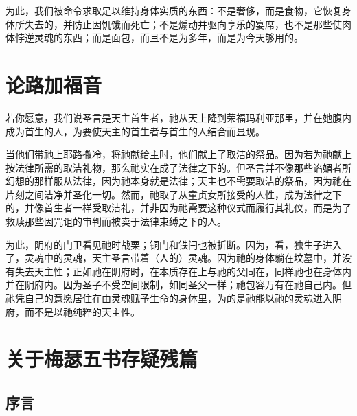 \par

为此，我们被命令求取足以维持身体实质的东西：不是奢侈，而是食物，它恢复身体所失去的，并防止因饥饿而死亡；不是煽动并驱向享乐的宴席，也不是那些使肉体悖逆灵魂的东西；而是面包，而且不是为多年，而是为今天够用的。\par


\section{论路加福音}

 若你愿意，我们说圣言是天主首生者，祂从天上降到荣福玛利亚那里，并在她腹内成为首生的人，为要使天主的首生者与首生的人结合而显现。\par

 当他们带祂上耶路撒冷，将祂献给主时，他们献上了取洁的祭品。因为若为祂献上按法律所需的取洁礼物，那么祂实在成了法律之下的。但圣言并不像那些谄媚者所幻想的那样服从法律，因为祂本身就是法律；天主也不需要取洁的祭品，因为祂在片刻之间洁净并圣化一切。然而，祂取了从童贞女所接受的人性，成为法律之下的，并像首生者一样受取洁礼，并非因为祂需要这种仪式而履行其礼仪，而是为了救赎那些因咒诅的审判而被卖于法律束缚之下的人。\par

 为此，阴府的门卫看见祂时战栗；铜门和铁闩也被折断。因为，看，独生子进入了，灵魂中的灵魂，天主圣言带着（人的）灵魂。因为祂的身体躺在坟墓中，并没有失去天主性；正如祂在阴府时，在本质存在上与祂的父同在，同样祂也在身体内并在阴府内。因为圣子不受空间限制，如同圣父一样；祂包容万有在祂自己内。但祂凭自己的意愿居住在由灵魂赋予生命的身体里，为的是祂能以祂的灵魂进入阴府，而不是以祂纯粹的天主性。\par


\section{关于梅瑟五书存疑残篇}


\subsection{序言}

